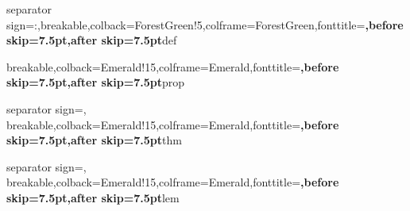 \newcommand\N{\ensuremath{\mathbb{N}}} %
\newcommand\Z{\ensuremath{\mathbb{Z}}} %
\newcommand\D{\ensuremath{\mathbb{D}}} %
\newcommand\Q{\ensuremath{\mathbb{Q}}} %
\newcommand\R{\ensuremath{\mathbb{R}}} %
\newcommand\C{\ensuremath{\mathbb{C}}} %
\renewcommand\O{\ensuremath{\emptyset}} %

\renewcommand\vec{\overrightarrow} 


\usepackage{systeme} %

\let\implies\Rightarrow
\let\impliedby\Leftarrow
\let\iff\Leftrightarrow


\newcommand\hr{
    \noindent\rule[0.5ex]{\linewidth}{0.5pt}
}


\newcommand\hide[1]{}



\usepackage{siunitx}
\newcommand\mat[1]{\mathbf{#1}}

\usepackage{listings, xcolor}



\usepackage{tikz}
\usepackage{tikz-cd}
\usetikzlibrary{intersections, angles, quotes, calc, positioning}
\usetikzlibrary{arrows.meta}
\usepackage{pgfplots}
\pgfplotsset{compat=1.13}


\usepackage{thmtools, tcolorbox}
\usepackage[framemethod=TikZ]{mdframed}




%
{separator sign={\hspace{-0.25em}:},breakable,colback=ForestGreen!5,colframe=ForestGreen,fonttitle=\bfseries\sffamily,before skip=7.5pt,after skip=7.5pt}{def}

%
{breakable,colback=Emerald!15,colframe=Emerald,fonttitle=\bfseries\sffamily,before skip=7.5pt,after skip=7.5pt}{prop}

%
{separator sign={}, breakable,colback=Emerald!15,colframe=Emerald,fonttitle=\bfseries\sffamily,before skip=7.5pt,after skip=7.5pt}{thm}

%
{separator sign={}, breakable,colback=Emerald!15,colframe=Emerald,fonttitle=\bfseries\sffamily,before skip=7.5pt,after skip=7.5pt}{lem}

